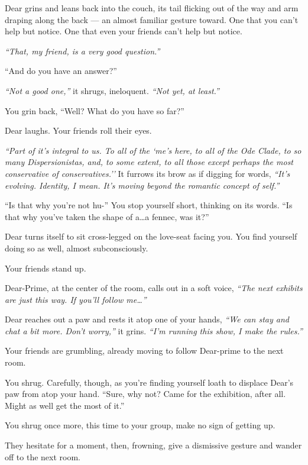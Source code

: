 Dear grins and leans back into the couch, its tail flicking out of the way and arm draping along the back --- an almost familiar gesture toward. One that you can't help but notice. One that even your friends can't help but notice.

\emph{``That, my friend, is a very good question.''}

``And do you have an answer?''

\emph{``Not a good one,''} it shrugs, ineloquent. \emph{``Not yet, at least.''}

You grin back, ``Well? What do you have so far?''

Dear laughs. Your friends roll their eyes.

\emph{``Part of it's integral to us. To all of the `me's here, to all of the Ode Clade, to so many Dispersionistas, and, to some extent, to all those except perhaps the most conservative of conservatives.''} It furrows its brow as if digging for words, \emph{``It's evolving. Identity, I mean. It's moving beyond the romantic concept of self.''}

``Is that why you're not hu-'' You stop yourself short, thinking on its words. ``Is that why you've taken the shape of a\ldots{}a fennec, was it?''

Dear turns itself to sit cross-legged on the love-seat facing you. You find yourself doing so as well, almost subconsciously.

Your friends stand up.

Dear-Prime, at the center of the room, calls out in a soft voice, \emph{``The next exhibits are just this way. If you'll follow me\ldots{}''}

Dear reaches out a paw and rests it atop one of your hands, \emph{``We can stay and chat a bit more. Don't worry,''} it grins. \emph{``I'm running this show, I make the rules.''}

Your friends are grumbling, already moving to follow Dear-prime to the next room.


You shrug. Carefully, though, as you're finding yourself loath to displace Dear's paw from atop your hand. ``Sure, why not? Came for the exhibition, after all. Might as well get the most of it.''

You shrug once more, this time to your group, make no sign of getting up.

They hesitate for a moment, then, frowning, give a dismissive gesture and wander off to the next room.

